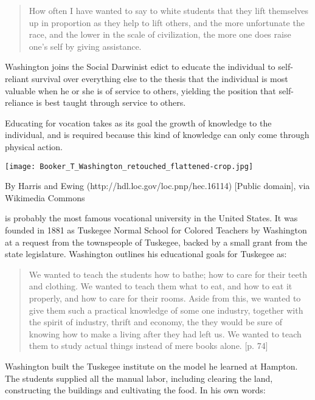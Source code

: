 \begin{quote}

How often I have wanted to say to white students that they lift themselves up in proportion as they help to lift others, and the more unfortunate the race, and the lower in the scale of civilization, the more one does raise one's self by giving assistance. ~\citep[p. 59]{Washington:1952uf}
\end{quote}

Washington joins the Social Darwinist edict to educate the individual to self-reliant survival over everything else to the thesis that the individual is most valuable when he or she is of service to others, yielding the position that self-reliance is best taught through service to others.\begin{purpose}\label{def:forvocation-washington}
Educating for vocation takes as its goal the growth of knowledge to the individual, and is required because this kind of knowledge can only come through physical action.
\end{purpose} 

\begin{marginfigure}\texttt{[image: Booker\_T\_Washington\_retouched\_flattened-crop.jpg]}\caption{By Harris and Ewing (http://hdl.loc.gov/loc.pnp/hec.16114) [Public domain], via Wikimedia Commons}\end{marginfigure}

 is probably the most famous vocational university in the United States. It was founded in 1881 as Tuskegee Normal School for Colored Teachers by Washington at a request from the townspeople of Tuskegee, backed by a small grant from the state legislature. Washington outlines his educational goals for Tuskegee as:

\begin{quote}

We wanted to teach the students how to bathe; how to care for their teeth and clothing. We wanted to teach them what to eat, and how to eat it properly, and how to care for their rooms. Aside from this, we wanted to give them such a practical knowledge of some one industry, together with the spirit of industry, thrift and economy, the they would be sure of knowing how to make a living after they had left us. We wanted to teach them to study actual things instead of mere books alone. [p. 74]
\end{quote}

Washington built the Tuskegee institute on the model he learned at Hampton. The students supplied all the manual labor, including clearing the land, constructing the buildings and cultivating the food. In his own words:

